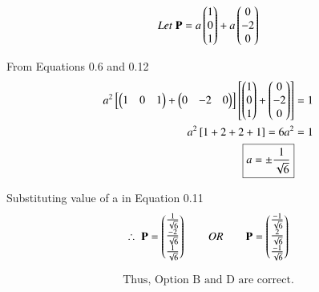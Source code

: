 \documentclass[journal]{IEEEtran}
\begin{document}
\begin{equation}
    Let \; \mathbf{P} = a\begin{pmatrix}1 \\ 0 \\ 1\end{pmatrix} + a\begin{pmatrix}0 \\ -2 \\ 0\end{pmatrix}
\end{equation}

From Equations 0.6 and 0.12
\begin{align}
   a^2 \left[\begin{pmatrix}1 & 0 & 1\end{pmatrix} + \begin{pmatrix}0 & -2 & 0\end{pmatrix}\right] \left[\begin{pmatrix}1 \\ 0 \\ 1\end{pmatrix} + \begin{pmatrix}0 \\ -2 \\ 0\end{pmatrix}\right] &= 1 \\ 
   a^2\left[ 1 + 2 + 2 + 1 \right] = 6a^2 &= 1\\
   \boxed{a = \pm \dfrac{1}{\sqrt{6}}}
\end{align}


Substituting value of a in Equation 0.11
\begin{align}
    \therefore \; \mathbf{P} = \begin{pmatrix}\frac{1}{\sqrt{6}} \\ \frac{-2}{\sqrt{6}} \\ \frac{1}{\sqrt{6}}\end{pmatrix} 
     \qquad OR \qquad
    \mathbf{P} = \begin{pmatrix}\frac{-1}{\sqrt{6}} \\ \frac{2}{\sqrt{6}} \\ \frac{-1}{\sqrt{6}}\end{pmatrix}
    \end{align}

\begin{align*}
    \boxed{\text{Thus, Option B and D are correct.}}
\end{align*}
\end{document}
